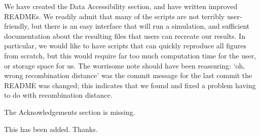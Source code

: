 \reply
We have created the Data Accessibility section, and have written improved READMEs.
We readily admit that many of the scripts are not terribly user-friendly,
but there is an easy interface that will run a simulation,
and sufficient documentation about the resulting files that users can recreate our results.
In particular, we would like to have scripts that can quickly reproduce all figures from scratch,
but this would require far too much computation time for the user, or storage space for us.
The worrisome note should have been reassuring: `oh, wrong recombination distance' was the commit message for the last commit the README was changed;
this indicates that we found and fixed a problem having to do with recombination distance.

\begin{point}{}
The Acknowledgements section is missing.
\end{point}

\reply This has been added. Thanks.


% 
% 
% 
% 


% 
